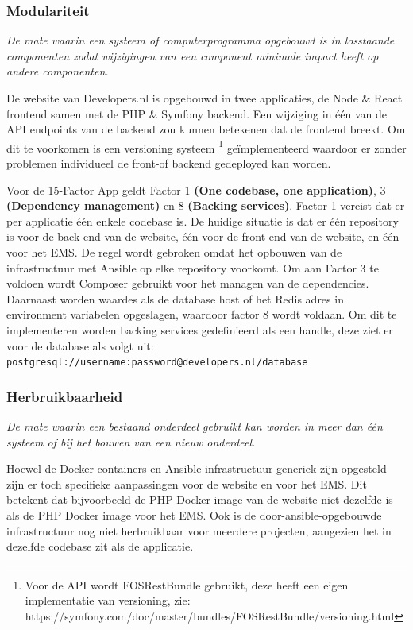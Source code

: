\subsubsection{Modulariteit} %
\textit{De mate waarin een systeem of computerprogramma opgebouwd is in losstaande componenten zodat wijzigingen van een component minimale impact heeft op andere componenten.}

De website van Developers.nl is opgebouwd in twee applicaties, de Node \& React frontend samen met de PHP \& Symfony backend. Een wijziging in één van de API endpoints van de backend zou kunnen betekenen dat de frontend breekt. Om dit te voorkomen is een versioning systeem \footnote{Voor de API wordt FOSRestBundle gebruikt, deze heeft een eigen implementatie van versioning, zie: https://symfony.com/doc/master/bundles/FOSRestBundle/versioning.html} geïmplementeerd waardoor er zonder problemen individueel de front-of backend gedeployed kan worden.

Voor de 15-Factor App geldt Factor 1 \textbf{(One codebase, one application)}, 3 \textbf{(Dependency management)} en 8 \textbf{(Backing services)}. Factor 1 vereist dat er per applicatie één enkele codebase is. De huidige situatie is dat er één repository is voor de back-end van de website, één voor de front-end van de website, en één voor het EMS. De regel wordt gebroken omdat het opbouwen van de infrastructuur met Ansible op elke repository voorkomt. Om aan Factor 3 te voldoen wordt Composer gebruikt voor het managen van de dependencies. Daarnaast worden waardes als de database host of het Redis adres in environment variabelen opgeslagen, waardoor factor 8 wordt voldaan. Om dit te implementeren worden backing services gedefinieerd als een handle, deze ziet er voor de database als volgt uit:\\ \texttt{postgresql://username:password@developers.nl/database}

\subsubsection{Herbruikbaarheid}
\textit{De mate waarin een bestaand onderdeel gebruikt kan worden in meer dan één systeem of bij het bouwen van een nieuw onderdeel.}

Hoewel de Docker containers en Ansible infrastructuur generiek zijn opgesteld zijn er toch specifieke aanpassingen voor de website en voor het EMS. Dit betekent dat bijvoorbeeld de PHP Docker image van de website niet dezelfde is als de PHP Docker image voor het EMS. Ook is de door-ansible-opgebouwde infrastructuur nog niet herbruikbaar voor meerdere projecten, aangezien het in dezelfde codebase zit als de applicatie.

